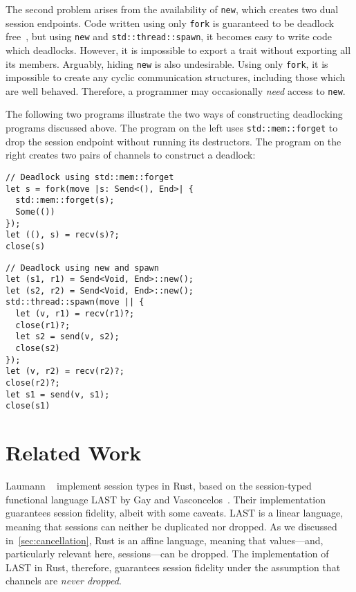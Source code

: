 \documentclass[copyright,creativecommons]{eptcs}
\begin{document}
The second problem arises from the availability of \lstinline{new}, which creates two dual session endpoints. Code written using only \lstinline{fork} is guaranteed to be deadlock free~\cite{lindley2015}, but using \lstinline{new} and \lstinline{std::thread::spawn}, it becomes easy to write code which deadlocks. However, it is impossible to export a trait without exporting all its members. Arguably, hiding \lstinline{new} is also undesirable. Using only \lstinline{fork}, it is impossible to create any cyclic communication structures, including those which are well behaved. Therefore, a programmer may occasionally \emph{need} access to \lstinline{new}.

The following two programs illustrate the two ways of constructing deadlocking programs discussed above. The program on the left uses \lstinline{std::mem::forget} to drop the session endpoint without running its destructors. The program on the right creates two pairs of channels to construct a deadlock:
\vspace{-0.5\baselineskip}
\begin{minipage}[t]{0.5\linewidth}
\begin{lstlisting}
// Deadlock using std::mem::forget
let s = fork(move |s: Send<(), End>| {
  std::mem::forget(s);
  Some(())
});
let ((), s) = recv(s)?;
close(s)
\end{lstlisting}
\end{minipage}%
\begin{minipage}[t]{0.5\linewidth}
\begin{lstlisting}
// Deadlock using new and spawn
let (s1, r1) = Send<Void, End>::new();
let (s2, r2) = Send<Void, End>::new();
std::thread::spawn(move || {
  let (v, r1) = recv(r1)?;
  close(r1)?;
  let s2 = send(v, s2);
  close(s2)
});
let (v, r2) = recv(r2)?;
close(r2)?;
let s1 = send(v, s1);
close(s1)
\end{lstlisting}
\end{minipage}

\section{Related Work}\label{sec:related-work}
Laumann \etal~\cite{jespersen2015} implement session types in Rust, based on the session-typed functional language LAST by Gay and Vasconcelos~\cite{gay2009}. Their implementation guarantees session fidelity, albeit with some caveats. LAST is a linear language, meaning that sessions can neither be duplicated nor dropped. As we discussed in~\cref{sec:cancellation}, Rust is an affine language, meaning that values---and, particularly relevant here, sessions---can be dropped. The implementation of LAST in Rust, therefore, guarantees session fidelity under the assumption that channels are \emph{never dropped}.
\end{document}
